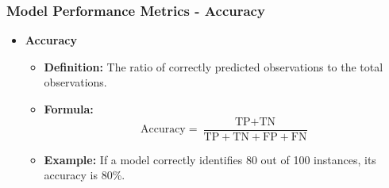 \documentclass[aspectratio=169]{beamer}
\begin{document}
\begin{frame}[fragile]
    \frametitle{Model Performance Metrics - Accuracy}
    \begin{itemize}
        \item \textbf{Accuracy}
        \begin{itemize}
            \item \textbf{Definition:} The ratio of correctly predicted observations to the total observations.
            \item \textbf{Formula:} 
            \[
            \text{Accuracy} = \frac{\text{TP} + \text{TN}}{\text{TP} + \text{TN} + \text{FP} + \text{FN}}
            \]
            \item \textbf{Example:} If a model correctly identifies 80 out of 100 instances, its accuracy is 80\%.
        \end{itemize}
    \end{itemize}
\end{frame}
\end{document}
